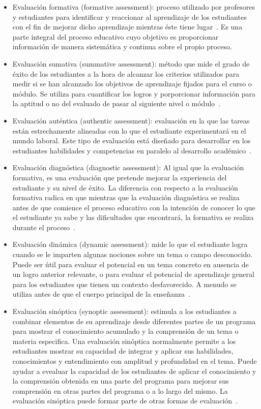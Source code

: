 \begin{itemize}
\item Evaluación formativa (formative assessment): proceso utilizado por profesores y estudiantes para identificar y reaccionar al aprendizaje de los estudiantes con el fin de mejorar dicho aprendizaje mientras éste tiene lugar~\cite{bell2001characteristics}. Es una parte integral del proceso educativo cuyo objetivo es proporcionar información de manera sistemática y continua sobre el propio proceso.
\item Evaluación sumativa (summative assessment): método que mide el grado de éxito de los estudiantes a la hora de alcanzar los criterios utilizados para medir si se han alcanzado los objetivos de aprendizaje fijados para el curso o módulo. Se utiliza para cuantificar los logros y porporcionar información para la aptitud o no del evaluado de pasar al siguiente nivel o módulo~\cite{tyler1967perspectives}.
\item Evaluación auténtica (authentic assessment): evaluación en la que las tareas están estrechamente alineadas con lo que el estudiante experimentará en el mundo laboral. Este tipo de evaluación está diseñado para desarrollar en los estudiantes habilidades y competencias en paralelo al desarrollo académico~\cite{gulikers2004five}.
\item Evaluación diagnóstica (diagnostic assessment): Al igual que la evaluación formativa, es una evaluación que pretende mejorar la experiencia del estudiante y su nivel de éxito. La diferencia con respecto a la evaluación formativa radica en que mientras que la evaluación diagnóstica se realiza antes de que comience el proceso educativo con la intención de conocer lo que el estudiante ya sabe y las dificultades que encontrará, la formativa se realiza durante el proceso~\cite{huhta2008diagnostic}.
\item Evaluación dinámica (dynamic assessment): mide lo que el estudiante logra cuando se le imparten algunas nociones sobre un tema o campo desconocido. Puede ser útil para evaluar el potencial en un tema concreto en ausencia de un logro anterior relevante, o para evaluar el potencial de aprendizaje general para los estudiantes que tienen un contexto desfavorecido. A menudo se utiliza antes de que el cuerpo principal de la enseñanza~\cite{lidz1987dynamic}.
\item Evaluación sinóptica (synoptic assessment): estimula a los estudiantes a combinar elementos de su aprendizaje desde diferentes partes de un programa para mostrar el conocimiento acumulado y la comprensión de un tema o materia especifica. Una evaluación sinóptica normalmente permite a los estudiantes mostrar su capacidad de integrar y aplicar sus habilidades, conocimientos y entendimiento con amplitud y profundidad en el tema. Puede ayudar a evealuar la capacidad de los estudiantes de aplicar el conocimiento y la comprensión obtenida en una parte del programa para mejorar sus comprensión en otras partes del programa o a lo largo del mismo. La evaluación sinóptica puede formar parte de otras formas de evaluación~\cite{qaa2006quality}.

\end{itemize}

